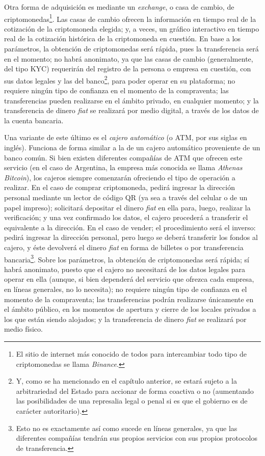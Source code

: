 \documentclass[12pt,a4paper,twoside]{book}
\begin{document}
Otra forma de adquisición es mediante un \textit{exchange}, o casa de cambio, de criptomonedas\footnote{El sitio de internet más conocido de todos para intercambiar todo tipo de criptomonedas se llama \textit{Binance}.}. Las casas de cambio ofrecen la información en tiempo real de la cotización de la criptomoneda elegida; y, a veces, un gráfico interactivo en tiempo real de la cotización histórica de la criptomoneda en cuestión. En base a los parámetros, la obtención de criptomonedas será rápida, pues la transferencia será en el momento; no habrá anonimato, ya que las casas de cambio (generalmente, del tipo KYC) requerirán del registro de la persona o empresa en cuestión, con sus datos legales y las del banco\footnote{Y, como se ha mencionado en el capítulo anterior, se estará sujeto a la arbitrariedad del Estado para accionar de forma coactiva o no (aumentando las posibilidades de una represalia legal o penal si es que el gobierno es de carácter autoritario).}, para poder operar en su plataforma; no requiere ningún tipo de confianza en el momento de la compraventa; las transferencias pueden realizarse en el ámbito privado, en cualquier momento; y la transferencia de dinero \textit{fiat} se realizará por medio digital, a través de los datos de la cuenta bancaria.

Una variante de este último es el \textit{cajero automático} (o ATM, por sus siglas en inglés). Funciona de forma similar a la de un cajero automático proveniente de un banco común. Si bien existen diferentes compañías de ATM que ofrecen este servicio (en el caso de Argentina, la empresa más conocida se llama \textit{Athenas Bitcoin}), los cajeros siempre comenzarán ofreciendo el tipo de operación a realizar. En el caso de comprar criptomoneda, pedirá ingresar la dirección personal mediante un lector de código QR (ya sea a través del celular o de un papel impreso); solicitará depositar el dinero \textit{fiat} en ella para, luego, realizar la verificación; y una vez confirmado los datos, el cajero procederá a transferir el equivalente a la dirección. En el caso de vender; el procedimiento será el inverso: pedirá ingresar la dirección personal, pero luego se deberá transferir los fondos al cajero, y éste devolverá el dinero \textit{fiat} en forma de billetes o por transferencia bancaria\footnote{Esto no es exactamente así como sucede en líneas generales, ya que las diferentes compañías tendrán sus propios servicios con sus propios protocolos de transferencia.}. Sobre los parámetros, la obtención de criptomonedas será rápida; sí habrá anonimato, puesto que el cajero no necesitará de los datos legales para operar en ella (aunque, si bien dependerá del servicio que ofrezca cada empresa, en líneas generales, no lo necesita); no requiere ningún tipo de confianza en el momento de la compraventa; las transferencias podrán realizarse únicamente en el ámbito público, en los momentos de apertura y cierre de los locales privados a los que están siendo alojados; y la transferencia de dinero \textit{fiat} se realizará por medio físico.
\end{document}
